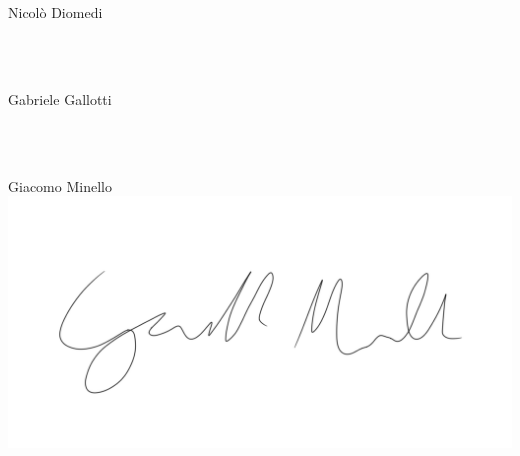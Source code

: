 \documentclass[12pt]{article}
\begin{document}
\begin{flushright}
Nicolò Diomedi
\end{flushright}
\\~\\
\begin{flushright}
Gabriele Gallotti
\end{flushright}
\\~\\
\begin{flushright}
Giacomo Minello\\
\includegraphics[scale=0.06]{figures/firmaMinello.png}
\end{flushright}

\newpage
\printbibliography[heading=bibintoc]
\end{document}
